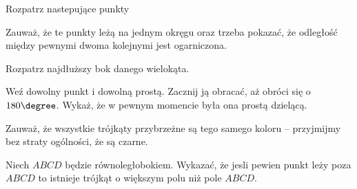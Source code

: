 
\begin{hints_list}
	\item Rozpatrz nastepujące punkty\\
	\begin{center}
	\end{center}
	\item Zauważ, że te punkty leżą na jednym okręgu oraz trzeba pokazać, że odległość między pewnymi dwoma kolejnymi jest ogarniczona.
	\item Rozpatrz najdłuższy bok danego wielokąta.
	\item Weź dowolny punkt i dowolną prostą. Zacznij ją obracać, aż obróci się o $180\degree$. Wykaż, że w pewnym momencie była ona prostą dzielącą.
	\item Zauważ, że wszystkie trójkąty przybrzeżne są tego samego koloru -- przyjmijmy bez straty ogólności, że są czarne.
	\item Niech $ABCD$ będzie równoległobokiem. Wykazać, że jesli pewien punkt leży poza $ABCD$ to istnieje trójkąt o większym polu niż pole $ABCD$.
\end{hints_list}